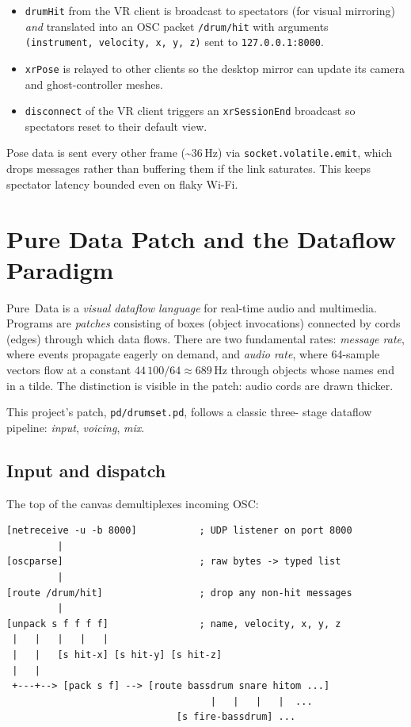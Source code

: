 \documentclass[11pt,a4paper]{article}
\begin{document}
\begin{itemize}[leftmargin=2em]
    \item \texttt{drumHit} from the VR client is broadcast to
          spectators (for visual mirroring) \emph{and} translated
          into an OSC packet \texttt{/drum/hit} with arguments
          \texttt{(instrument,\,velocity,\,x,\,y,\,z)} sent to
          \texttt{127.0.0.1:8000}.
    \item \texttt{xrPose} is relayed to other clients so the desktop
          mirror can update its camera and ghost-controller meshes.
    \item \texttt{disconnect} of the VR client triggers an
          \texttt{xrSessionEnd} broadcast so spectators reset to
          their default view.
\end{itemize}

Pose data is sent every other frame (\textasciitilde 36\,Hz) via
\texttt{socket.volatile.emit}, which drops messages rather than
buffering them if the link saturates. This keeps spectator latency
bounded even on flaky Wi-Fi.

\section{Pure Data Patch and the Dataflow Paradigm}
\label{sec:pd}

Pure~Data is a \emph{visual dataflow language} for real-time audio and
multimedia. Programs are \emph{patches} consisting of boxes (object
invocations) connected by cords (edges) through which data flows.
There are two fundamental rates: \emph{message rate}, where events
propagate eagerly on demand, and \emph{audio rate}, where 64-sample
vectors flow at a constant $44\,100/64 \approx 689$\,Hz through
objects whose names end in a tilde. The distinction is visible in the
patch: audio cords are drawn thicker.

This project's patch, \texttt{pd/drumset.pd}, follows a classic three-
stage dataflow pipeline: \emph{input}, \emph{voicing}, \emph{mix}.

\subsection{Input and dispatch}

The top of the canvas demultiplexes incoming OSC:

\begin{lstlisting}[language=puredata]
[netreceive -u -b 8000]           ; UDP listener on port 8000
         |
[oscparse]                        ; raw bytes -> typed list
         |
[route /drum/hit]                 ; drop any non-hit messages
         |
[unpack s f f f f]                ; name, velocity, x, y, z
 |   |   |   |   |
 |   |   [s hit-x] [s hit-y] [s hit-z]
 |   |
 +---+--> [pack s f] --> [route bassdrum snare hitom ...]
                                    |   |   |   |  ...
                              [s fire-bassdrum] ...
\end{lstlisting}
\end{document}
